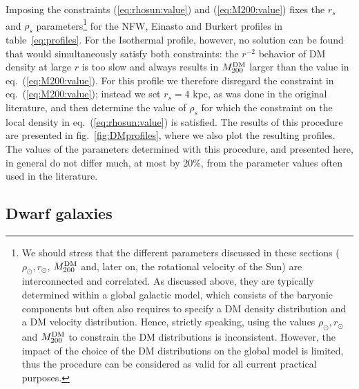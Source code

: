 Imposing the constraints (\ref{eq:rhosun:value}) and (\ref{eq:M200:value}) fixes the $r_s$ and $\rho_s$ parameters\footnote{We should stress that the different parameters discussed in these sections ($\rho_\odot, r_\odot$, $M^{\rm DM}_{200}$ and, later on, the rotational velocity of the Sun) are interconnected and correlated. As discussed above, they are typically determined within a global galactic model, which consists of the baryonic components but often also requires to specify a DM density distribution and a DM velocity distribution. Hence, strictly speaking, using the values $\rho_\odot, r_\odot$ and $M^{\rm DM}_{200}$ to constrain the DM distributions is inconsistent. However, the impact of the choice of the DM distributions on the global model is limited, thus the procedure can be considered as valid for all current practical purposes.} 
for the NFW, Einasto and Burkert profiles in table~\ref{eq:profiles}. For the Isothermal profile, however, no solution can be found that would simultaneously satisfy both constraints: the $r^{-2}$ behavior of DM density at large $r$ is too slow and always results in $M^{\rm DM}_{200}$  larger than the value in eq.~(\ref{eq:M200:value}). For this profile we therefore disregard the constraint in eq.~(\ref{eq:M200:value}); instead we set $r_s = 4$ kpc, as was done in the original literature, and then determine the value of $\rho_s$ for which the constraint on the local density in eq.~(\ref{eq:rhosun:value}) is satisfied.
The results of this procedure are presented in fig.~\ref{fig:DMprofiles}, where we also plot the resulting profiles. 
The values of the parameters determined with this procedure, and presented here, in general 
do not differ much, at most by 20\%, from the parameter values often used 
in the literature.



\subsection{Dwarf galaxies}
\label{sec:dwarfs}

